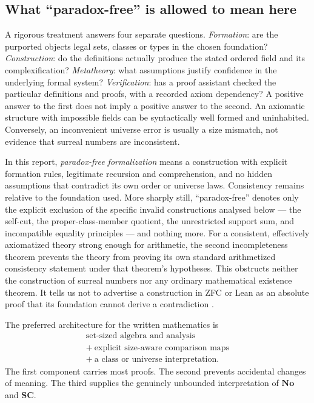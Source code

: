 \documentclass[11pt,letterpaper]{article}
\numberwithin{equation}{section}
\theoremstyle{definition}
\theoremstyle{remark}
\newcommand{\No}{\mathbf{No}}
\newcommand{\SC}{\mathbf{SC}}
\begin{document}
\subsection{What ``paradox-free'' is allowed to mean here}
\label{found:sub:paradoxfree}
A rigorous treatment answers four separate questions. \emph{Formation}: are the
purported objects legal sets, classes or types in the chosen foundation?
\emph{Construction}: do the definitions actually produce the stated ordered
field and its complexification? \emph{Metatheory}: what assumptions justify
confidence in the underlying formal system? \emph{Verification}: has a proof
assistant checked the particular definitions and proofs, with a recorded axiom
dependency? A positive answer to the first does not imply a positive answer to
the second. An axiomatic structure with impossible fields can be syntactically
well formed and uninhabited. Conversely, an inconvenient universe error is
usually a size mismatch, not evidence that surreal numbers are inconsistent.

In this report, \emph{paradox-free formalization} means a construction with
explicit formation rules, legitimate recursion and comprehension, and no hidden
assumptions that contradict its own order or universe laws. Consistency remains
relative to the foundation used. More sharply still, ``paradox-free'' denotes
only the explicit exclusion of the specific invalid constructions analysed
below --- the self-cut, the proper-class-member quotient, the unrestricted
support sum, and incompatible equality principles --- and nothing more. For a
consistent, effectively axiomatized theory strong enough for arithmetic, the
second incompleteness theorem prevents the theory from proving its own
standard arithmetized consistency statement under that theorem's hypotheses.
This obstructs neither the construction of surreal numbers nor any ordinary
mathematical existence theorem. It tells us not to advertise a construction in
ZFC or Lean as an absolute proof that its foundation cannot derive a
contradiction \cite[\S5]{found:ShulmanSize}.

The preferred architecture for the written mathematics is
\begin{equation}\label{found:eq:architecture}
 \begin{gathered}
 \boxed{\text{set-sized algebra and analysis}}\\[0.35em]
 +\ \boxed{\text{explicit size-aware comparison maps}}\\[0.35em]
 +\ \boxed{\text{a class or universe interpretation}}.
 \end{gathered}
\end{equation}
The first component carries most proofs. The second prevents accidental changes
of meaning. The third supplies the genuinely unbounded interpretation of $\No$
and $\SC$.
\end{document}
